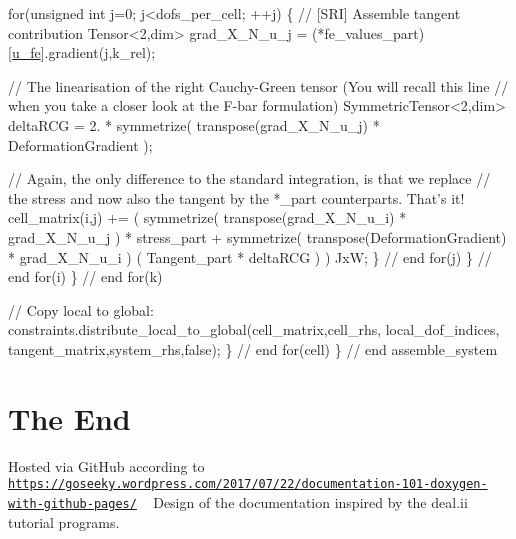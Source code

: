 \begin{DoxyCode}
                \textcolor{keywordflow}{for}(\textcolor{keywordtype}{unsigned} \textcolor{keywordtype}{int} j=0; j<dofs\_per\_cell; ++j)
                \{
                    \textcolor{comment}{// [SRI] Assemble tangent contribution}
                     Tensor<2,dim> grad\_X\_N\_u\_j = (*fe\_values\_part)[\hyperlink{assembly__routine__SRI_8cc_ae50a49c136e49c33fcd5a555a00009dd}{u\_fe}].gradient(j,k\_rel);

                    \textcolor{comment}{// The linearisation of the right Cauchy-Green tensor (You will recall this line}
                    \textcolor{comment}{// when you take a closer look at the F-bar formulation)}
                     SymmetricTensor<2,dim> deltaRCG = 2. * symmetrize( transpose(grad\_X\_N\_u\_j) * 
      DeformationGradient );

                    \textcolor{comment}{// Again, the only difference to the standard integration, is that we replace}
                    \textcolor{comment}{// the stress and now also the tangent by the *\_part counterparts. That's it!}
                    cell\_matrix(i,j) += (
                                            symmetrize( transpose(grad\_X\_N\_u\_i) * grad\_X\_N\_u\_j ) * 
      stress\_part
                                            +
                                            symmetrize( transpose(DeformationGradient) * grad\_X\_N\_u\_i )
                                              ( Tangent\_part * deltaRCG )
                                        )
                                          JxW;
                \} \textcolor{comment}{// end for(j)}
             \} \textcolor{comment}{// end for(i)}
        \} \textcolor{comment}{// end for(k)}

        \textcolor{comment}{// Copy local to global:}
        constraints.distribute\_local\_to\_global(cell\_matrix,cell\_rhs,
                                local\_dof\_indices,
                                tangent\_matrix,system\_rhs,\textcolor{keyword}{false});
    \} \textcolor{comment}{// end for(cell)}
\} \textcolor{comment}{// end assemble\_system}
\end{DoxyCode}
\hypertarget{index_END}{}\section{The End}\label{index_END}
Hosted via Git\+Hub according to \href{https://goseeky.wordpress.com/2017/07/22/documentation-101-doxygen-with-github-pages/}{\tt https\+://goseeky.\+wordpress.\+com/2017/07/22/documentation-\/101-\/doxygen-\/with-\/github-\/pages/} ~\newline
Design of the documentation inspired by the deal.\+ii tutorial programs. 